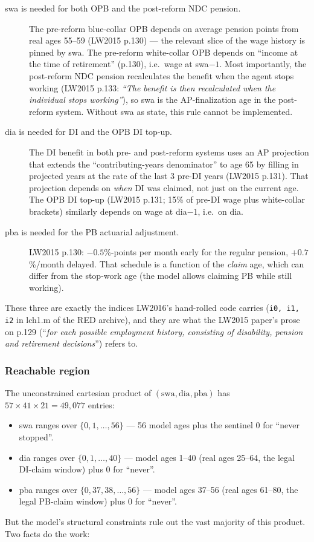 \begin{description}
 \item[swa is needed for both OPB and the post-reform NDC pension.] The pre-reform blue-collar OPB depends on average pension points from real ages 55--59 (LW2015 p.130) --- the relevant slice of the wage history is pinned by swa. The pre-reform white-collar OPB depends on ``income at the time of retirement'' (p.130), i.e.\ wage at swa$-1$. Most importantly, the post-reform NDC pension recalculates the benefit when the agent stops working (LW2015 p.133: \emph{``The benefit is then recalculated when the individual stops working''}), so swa is the AP-finalization age in the post-reform system. Without swa as state, this rule cannot be implemented.
 \item[dia is needed for DI and the OPB DI top-up.] The DI benefit in both pre- and post-reform systems uses an AP projection that extends the ``contributing-years denominator'' to age 65 by filling in projected years at the rate of the last 3 pre-DI years (LW2015 p.131). That projection depends on \emph{when} DI was claimed, not just on the current age. The OPB DI top-up (LW2015 p.131; 15\% of pre-DI wage plus white-collar brackets) similarly depends on wage at dia$-1$, i.e.\ on dia.
 \item[pba is needed for the PB actuarial adjustment.] LW2015 p.130: $-0.5$\%-points per month early for the regular pension, $+0.7$\%/month delayed. That schedule is a function of the \emph{claim} age, which can differ from the stop-work age (the model allows claiming PB while still working).
\end{description}

These three are exactly the indices LW2016's hand-rolled code carries (\verb|i0, i1, i2| in lch1.m of the RED archive), and they are what the LW2015 paper's prose on p.129 (``\emph{for each possible employment history, consisting of disability, pension and retirement decisions}'') refers to.

\subsubsection{Reachable region}\label{sec:reach}

The unconstrained cartesian product of $(\text{swa}, \text{dia}, \text{pba})$ has $57 \times 41 \times 21 = 49{,}077$ entries:
\begin{itemize}
 \item swa ranges over $\{0,1,\ldots,56\}$ --- 56 model ages plus the sentinel 0 for ``never stopped''.
 \item dia ranges over $\{0, 1, \ldots, 40\}$ --- model ages 1--40 (real ages 25--64, the legal DI-claim window) plus 0 for ``never''.
 \item pba ranges over $\{0, 37, 38, \ldots, 56\}$ --- model ages 37--56 (real ages 61--80, the legal PB-claim window) plus 0 for ``never''.
\end{itemize}
But the model's structural constraints rule out the vast majority of this product. Two facts do the work:

